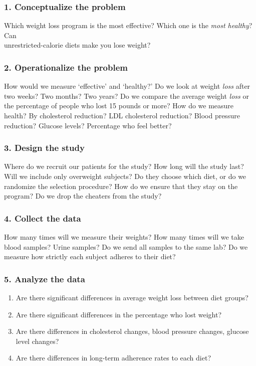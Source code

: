 \documentclass[11pt]{book}\usepackage[]{graphicx}\usepackage[]{color}
\begin{document}
\subsubsection{1.	Conceptualize the problem}

Which weight loss program is the most effective?   Which one is the \textit{most healthy}?   Can \\ unrestricted-calorie diets make you lose weight?

\subsubsection{2.	Operationalize the problem}

How would we measure `effective' and `healthy?'  Do we look at weight \textit{loss} after two weeks? Two months?  Two years?  Do we compare the average weight \textit{loss} or the percentage of people who lost 15 pounds or more?  How do we measure health?  By cholesterol reduction?  LDL cholesterol reduction?  Blood pressure reduction?  Glucose levels?  Percentage who feel better?

\subsubsection{3.	Design the study}

Where do we recruit our patients for the study? How long will the study last?  Will we include only overweight subjects?  Do they choose which diet, or do we randomize the selection procedure?  How do we ensure that they stay on the program?  Do we drop the cheaters from the study?

\subsubsection{4.	Collect the data}

How many times will we measure their weights?  How many times will we take blood samples?  Urine samples?  Do we send all samples to the same lab?  Do we measure how strictly each subject adheres to their diet?

\subsubsection{5.	Analyze the data}

\begin{enumerate}
\item Are there significant differences in average weight loss between diet groups?  
\item Are there significant differences in the percentage who lost weight?  
\item Are there differences in cholesterol changes, blood pressure changes, glucose level changes?  
\item Are there differences in long-term adherence rates to each diet?
\end{enumerate}
\end{document}

